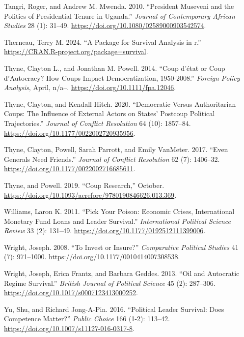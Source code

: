 \documentclass[
  12pt,
]{report}
\newlength{\cslhangindent}
\newenvironment{CSLReferences}[2] %
 {\begin{list}{}{%
  \setlength{\itemindent}{0pt}
  \setlength{\leftmargin}{0pt}
  \setlength{\parsep}{0pt}
  \ifodd #1
   \setlength{\leftmargin}{\cslhangindent}
   \setlength{\itemindent}{-1\cslhangindent}
  \fi
  \setlength{\itemsep}{#2\baselineskip}}}
 {\end{list}}
\begin{document}
\begin{CSLReferences}{1}{0}
Tangri, Roger, and Andrew M. Mwenda. 2010. {``President Museveni and the
Politics of Presidential Tenure in Uganda.''} \emph{Journal of
Contemporary African Studies} 28 (1): 31--49.
\url{https://doi.org/10.1080/02589000903542574}.

Therneau, Terry M. 2024. {``A Package for Survival Analysis in r.''}
\url{https://CRAN.R-project.org/package=survival}.

Thyne, Clayton L., and Jonathan M. Powell. 2014. {``Coup d{'}état or
Coup d'Autocracy? How Coups Impact Democratization, 1950-2008.''}
\emph{Foreign Policy Analysis}, April, n/a--.
\url{https://doi.org/10.1111/fpa.12046}.

Thyne, Clayton, and Kendall Hitch. 2020. {``Democratic Versus
Authoritarian Coups: The Influence of External Actors on States{'}
Postcoup Political Trajectories.''} \emph{Journal of Conflict
Resolution} 64 (10): 1857--84.
\url{https://doi.org/10.1177/0022002720935956}.

Thyne, Clayton, Powell, Sarah Parrott, and Emily VanMeter. 2017. {``Even
Generals Need Friends.''} \emph{Journal of Conflict Resolution} 62 (7):
1406--32. \url{https://doi.org/10.1177/0022002716685611}.

Thyne, and Powell. 2019. {``Coup Research,''} October.
\url{https://doi.org/10.1093/acrefore/9780190846626.013.369}.

Williams, Laron K. 2011. {``Pick Your Poison: Economic Crises,
International Monetary Fund Loans and Leader Survival.''}
\emph{International Political Science Review} 33 (2): 131--49.
\url{https://doi.org/10.1177/0192512111399006}.

Wright, Joseph. 2008. {``To Invest or Insure?''} \emph{Comparative
Political Studies} 41 (7): 971--1000.
\url{https://doi.org/10.1177/0010414007308538}.

Wright, Joseph, Erica Frantz, and Barbara Geddes. 2013. {``Oil and
Autocratic Regime Survival.''} \emph{British Journal of Political
Science} 45 (2): 287--306.
\url{https://doi.org/10.1017/s0007123413000252}.

Yu, Shu, and Richard Jong-A-Pin. 2016. {``Political Leader Survival:
Does Competence Matter?''} \emph{Public Choice} 166 (1-2): 113--42.
\url{https://doi.org/10.1007/s11127-016-0317-8}.

\end{CSLReferences}
\end{document}
